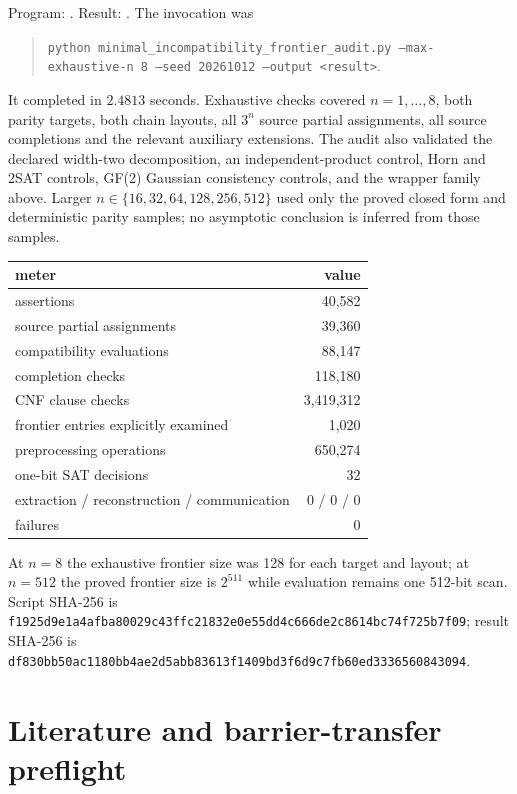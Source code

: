 \documentclass[11pt]{article}
\begin{document}
Program:
.
Result:
.
The invocation was
\begin{quote}\small
\texttt{python minimal\_incompatibility\_frontier\_audit.py
--max-exhaustive-n 8 --seed 20261012 --output <result>}.\normalsize
\end{quote}
It completed in $2.4813$ seconds.  Exhaustive checks covered $n=1,\ldots,8$,
both parity targets, both chain layouts, all $3^n$ source partial assignments,
all source completions and the relevant auxiliary extensions.  The audit also
validated the declared width-two decomposition, an independent-product
control, Horn and 2SAT controls, GF(2) Gaussian consistency controls, and the
wrapper family above.  Larger $n\in\{16,32,64,128,256,512\}$ used only the
proved closed form and deterministic parity samples; no asymptotic conclusion
is inferred from those samples.

\begin{center}
\begin{tabular}{lr}
\toprule
meter & value\\
\midrule
assertions & 40,582\\
source partial assignments & 39,360\\
compatibility evaluations & 88,147\\
completion checks & 118,180\\
CNF clause checks & 3,419,312\\
frontier entries explicitly examined & 1,020\\
preprocessing operations & 650,274\\
one-bit SAT decisions & 32\\
extraction / reconstruction / communication & 0 / 0 / 0\\
failures & 0\\
\bottomrule
\end{tabular}
\end{center}
At $n=8$ the exhaustive frontier size was 128 for each target and layout; at
$n=512$ the proved frontier size is $2^{511}$ while evaluation remains one
512-bit scan.  Script SHA-256 is
\texttt{f1925d9e1a4afba80029c43ffc21832e0e55dd4c666de2c8614bc74f725b7f09};
result SHA-256 is
\texttt{df830bb50ac1180bb4ae2d5abb83613f1409bd3f6d9c7fb60ed3336560843094}.

\section{Literature and barrier-transfer preflight}
\end{document}
